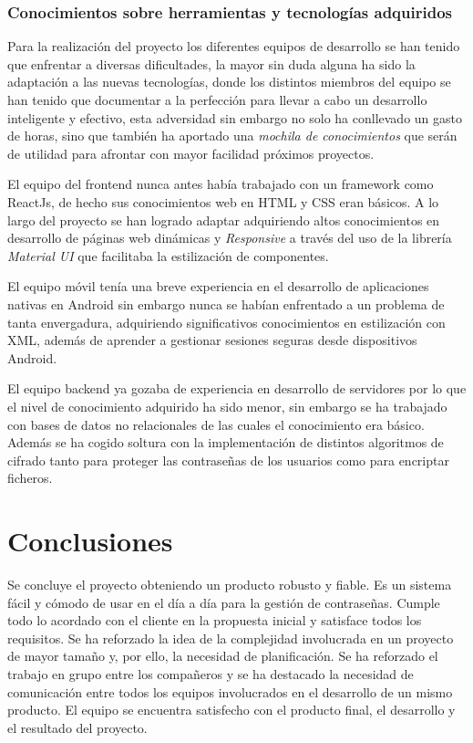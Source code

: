 \documentclass{article}
\begin{document}
\subsubsection*{Conocimientos sobre herramientas y tecnologías adquiridos}

Para la realización del proyecto los diferentes equipos de desarrollo se han tenido que enfrentar a diversas dificultades, la mayor sin duda alguna ha sido la adaptación a las nuevas tecnologías, donde los distintos miembros del equipo se han tenido que documentar a la perfección para llevar a cabo un desarrollo inteligente y efectivo, esta adversidad sin embargo no solo ha conllevado un gasto de horas, sino que también ha aportado una \textit{mochila de conocimientos} que serán de utilidad para afrontar con mayor facilidad próximos proyectos.

El equipo del frontend nunca antes había trabajado con un framework como ReactJs, de hecho sus conocimientos web en HTML y CSS eran básicos. A lo largo del proyecto se han logrado adaptar adquiriendo altos conocimientos en desarrollo de páginas web dinámicas y \textit{Responsive} a través del uso de la librería \textit{Material UI} que facilitaba la estilización de componentes.

El equipo móvil tenía una breve experiencia en el desarrollo de aplicaciones nativas en Android sin embargo nunca se habían enfrentado a un problema de tanta envergadura, adquiriendo significativos conocimientos en estilización con XML, además de aprender a gestionar sesiones seguras desde dispositivos Android.

El equipo backend ya gozaba de experiencia en desarrollo de servidores por lo que el nivel de conocimiento adquirido ha sido menor, sin embargo se ha trabajado con bases de datos no relacionales de las cuales el conocimiento era básico. Además se ha cogido soltura con la implementación de distintos algoritmos de cifrado tanto para proteger las contraseñas de los usuarios como para encriptar ficheros.

\pagebreak

\section*{Conclusiones}

Se concluye el proyecto obteniendo un producto robusto y fiable. Es un sistema fácil y cómodo de usar en el día a día para la gestión de contraseñas. Cumple todo lo acordado con el cliente en la propuesta inicial y satisface todos los requisitos. Se ha reforzado la idea de la complejidad involucrada en un proyecto de mayor tamaño y, por ello, la necesidad de planificación. Se ha reforzado el trabajo en grupo entre los compañeros y se ha destacado la necesidad de comunicación entre todos los equipos involucrados en el desarrollo de un mismo producto. El equipo se encuentra satisfecho con el producto final, el desarrollo y el resultado del proyecto.
\end{document}
